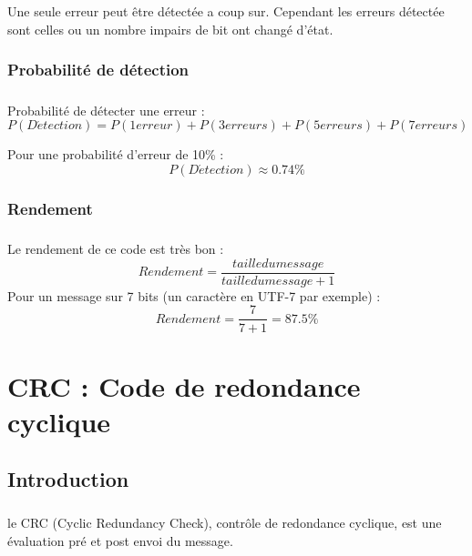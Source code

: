 \documentclass[a4paper,10pt]{report}
\begin{document}
                    \paragraph{}
                        Une seule erreur peut être détectée a coup sur.
                        Cependant les erreurs détectée sont celles ou un nombre impairs de bit ont changé d'état.
                \subsection{Probabilité de détection}
                    \paragraph{}
                        Probabilité de détecter une erreur :
                        \[  P(D\acute{e}tection) = P(1 erreur) + P(3 erreurs) + P(5 erreurs) + P(7 erreurs) \]
                        
                        Pour une probabilité d'erreur de 10\% :
                        \[  P(D\acute{e}tection) \approx 0.74\% \]
                \subsection{Rendement}
                    \paragraph{}
                        Le rendement de ce code est très bon :
                        \[  Rendement = \frac{taille du message}{taille du message+1} \]
                        Pour un message sur 7 bits (un caractère en UTF-7 par exemple) :
                        \[  Rendement = \frac{7}{7+1} = 87.5\% \]


        \chapter{CRC : Code de redondance cyclique}
            \section{Introduction}
                \paragraph{}
                    le CRC (Cyclic Redundancy Check), contrôle de redondance cyclique,
                    est une évaluation pré et post envoi du message.
            \newpage
\end{document}
